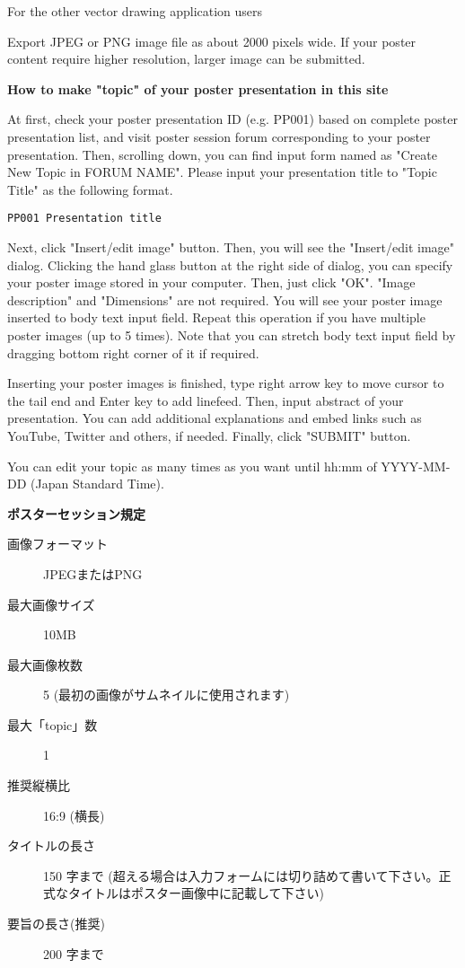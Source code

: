 \documentclass[titlepage,10pt,a4paper,uplatex]{jsbook}
\newenvironment{content}{\begin{shaded}\vspace{-1em}\raggedright\ttfamily\footnotesize\setlength{\baselineskip}{1.4em}}{\end{shaded}\vspace{-1em}}
\renewcommand{\textbf}[1]{{\bfseries\sffamily#1}}
\begin{document}
\begin{content}
{\Large For the other vector drawing application users}

Export JPEG or PNG image file as about 2000 pixels wide. If your poster content require higher resolution, larger image can be submitted.

\textbf{\Large How to make "topic" of your poster presentation in this site}

At first, check your poster presentation ID (e.g. PP001) based on complete poster presentation list, and visit poster session forum corresponding to your poster presentation. Then, scrolling down, you can find input form named as "Create New Topic in FORUM NAME". Please input your presentation title to "Topic Title" as the following format.

\texttt{PP001 Presentation title}

Next, click "Insert/edit image" button. Then, you will see the "Insert/edit image" dialog. Clicking the hand glass button at the right side of dialog, you can specify your poster image stored in your computer. Then, just click "OK". "Image description" and "Dimensions" are not required. You will see your poster image inserted to body text input field. Repeat this operation if you have multiple poster images (up to 5 times). Note that you can stretch body text input field by dragging bottom right corner of it if required.

Inserting your poster images is finished, type right arrow key to move cursor to the tail end and Enter key to add linefeed. Then, input abstract of your presentation. You can add additional explanations and embed links such as YouTube, Twitter and others, if needed. Finally, click "SUBMIT" button.

You can edit your topic as many times as you want until hh:mm of YYYY-MM-DD (Japan Standard Time).

\textbf{\Large ポスターセッション規定}

\begin{description}
\item[画像フォーマット] JPEGまたはPNG
\item[最大画像サイズ] 10MB
\item[最大画像枚数] 5 (最初の画像がサムネイルに使用されます)
\item[最大「topic」数] 1
\item[推奨縦横比] 16:9 (横長)
\item[タイトルの長さ] 150 字まで (超える場合は入力フォームには切り詰めて書いて下さい。正式なタイトルはポスター画像中に記載して下さい)
\item[要旨の長さ(推奨)] 200 字まで
\end{description}


\end{content}
\end{document}
